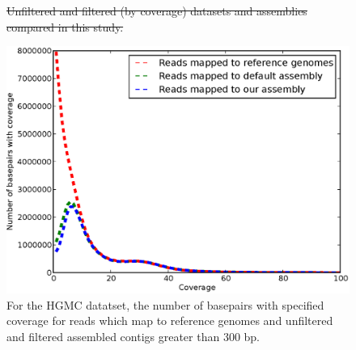 \documentclass{pnastwo}
\providecommand{\DIFdel}[1]{{\protect\color{red}\sout{#1}}}                      %
\providecommand{\DIFdelFL}[1]{\DIFdel{#1}} %
\providecommand{\DIFdelbeginFL}{} %
\providecommand{\DIFdelendFL}{} %
\begin{document}
\begin{figure}
\DIFdelbeginFL %
{%
\DIFdelFL{Unfiltered and filtered (by coverage) datasets and assemblies compared in this study.}}

\DIFdelendFL \centerline{\includegraphics[width=.7\textwidth]{./figures/coverage.eps}}
\caption{For the HGMC datatset, the number of basepairs with specified coverage for reads which
  map to reference genomes and unfiltered and filtered assembled
  contigs greater than 300 bp.}
\label{coveragehmp}
\end{figure}
\end{document}
